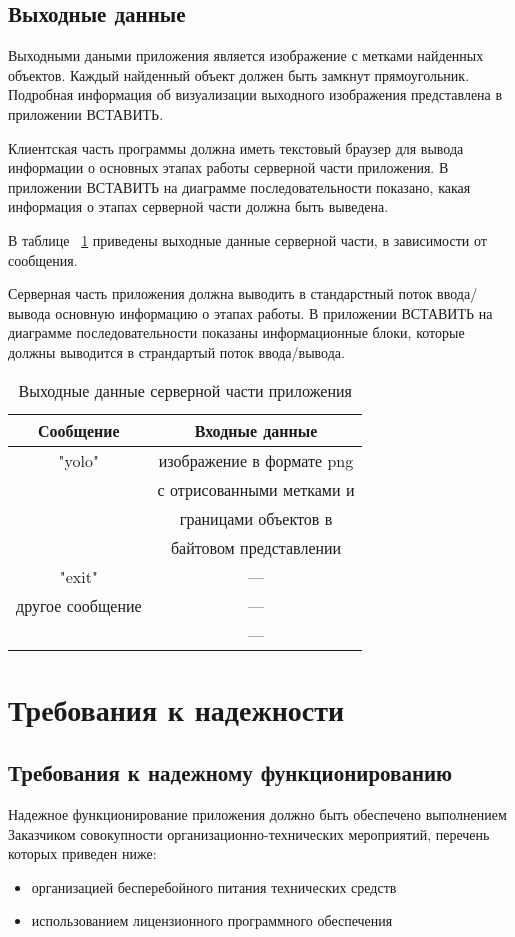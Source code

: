 \documentclass[a4paper,english]{G2-105}
\begin{document}
\subsection{Выходные данные}
\par Выходными даными приложения является изображение с метками найденных объектов. Каждый найденный объект должен быть замкнут прямоугольник. Подробная информация об визуализации выходного изображения представлена в приложении ВСТАВИТЬ.
\par Клиентская часть программы должна иметь текстовый браузер для вывода информации о основных этапах работы серверной части приложения. В приложении ВСТАВИТЬ на диаграмме последовательности показано, какая информация о этапах серверной части должна быть выведена.
\par В таблице ~\ref{output} приведены выходные данные серверной части, в зависимости от сообщения.
\par Серверная часть приложения должна выводить в стандарстный поток ввода/вывода основную информацию о этапах работы. В приложении ВСТАВИТЬ на диаграмме последовательности показаны информационные блоки, которые должны выводится в страндартый поток ввода/вывода.
\begin{longtable}{|c|c|}
    \caption{Выходные данные серверной части приложения} \label{output} \\ \hline
    Сообщение        & Входные данные            \\ \hline \endhead
    "yolo"           & изображение в формате png \\ 
                     & с отрисованными метками и \\
                     & границами объектов в      \\
                     & байтовом представлении    \\ \hline
    "exit"           & ---                       \\ \hline
    другое сообщение & ---                       \\  
    	                 & ---                       \\
\end{longtable}

\section{Требования к надежности}
\subsection{Требования к надежному функционированию}
Надежное функционирование приложения должно быть обеспечено выполнением Заказчиком совокупности организационно-технических мероприятий, перечень которых приведен ниже:
\begin{itemize}
\item организацией бесперебойного питания технических средств
\item использованием лицензионного программного обеспечения
\end{itemize}
\end{document}
